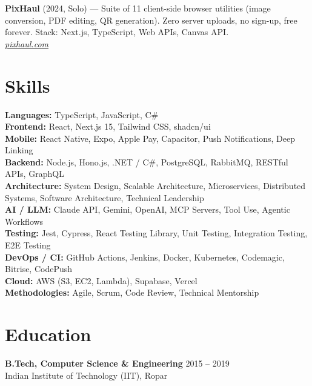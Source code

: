 \documentclass[11pt, letterpaper]{article}
\begin{document}
\vspace{4pt}

\textbf{PixHaul} (2024, Solo) — Suite of 11 client-side browser utilities (image conversion, PDF editing, QR generation). Zero server uploads, no sign-up, free forever. Stack: Next.js, TypeScript, Web APIs, Canvas API.\\
\textit{\href{https://pixhaul.com/}{pixhaul.com}}

\section{Skills}

\textbf{Languages:} TypeScript, JavaScript, C\#\\[2pt]
\textbf{Frontend:} React, Next.js 15, Tailwind CSS, shadcn/ui\\[2pt]
\textbf{Mobile:} React Native, Expo, Apple Pay, Capacitor, Push Notifications, Deep Linking\\[2pt]
\textbf{Backend:} Node.js, Hono.js, .NET / C\#, PostgreSQL, RabbitMQ, RESTful APIs, GraphQL\\[2pt]
\textbf{Architecture:} System Design, Scalable Architecture, Microservices, Distributed Systems, Software Architecture, Technical Leadership\\[2pt]
\textbf{AI / LLM:} Claude API, Gemini, OpenAI, MCP Servers, Tool Use, Agentic Workflows\\[2pt]
\textbf{Testing:} Jest, Cypress, React Testing Library, Unit Testing, Integration Testing, E2E Testing\\[2pt]
\textbf{DevOps / CI:} GitHub Actions, Jenkins, Docker, Kubernetes, Codemagic, Bitrise, CodePush\\[2pt]
\textbf{Cloud:} AWS (S3, EC2, Lambda), Supabase, Vercel\\[2pt]
\textbf{Methodologies:} Agile, Scrum, Code Review, Technical Mentorship

\section{Education}

\textbf{B.Tech, Computer Science \& Engineering} \hfill 2015 – 2019\\
Indian Institute of Technology (IIT), Ropar
\end{document}
